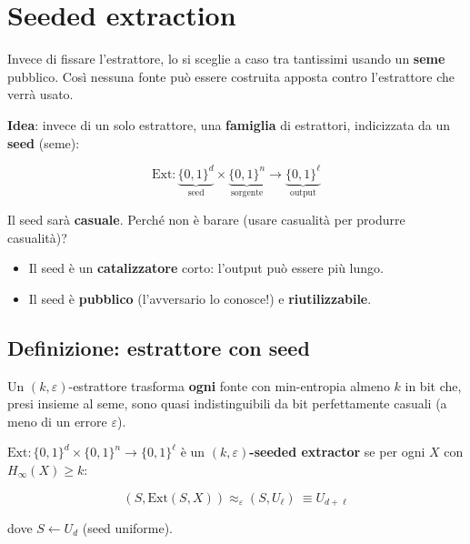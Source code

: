 \section{Seeded extraction}

\begin{inbreve}

Invece di fissare l'estrattore, lo si sceglie a caso tra tantissimi usando un \textbf{seme} pubblico. Così nessuna fonte può essere costruita apposta contro l'estrattore che verrà usato.

\end{inbreve}

\textbf{Idea}: invece di un solo estrattore, una \textbf{famiglia} di estrattori, indicizzata da un \textbf{seed} (seme):

\[
\text{Ext}: \underbrace{\{0,1\}^d}_{\text{seed}} \times \underbrace{\{0,1\}^n}_{\text{sorgente}} \to \underbrace{\{0,1\}^\ell}_{\text{output}}
\]

Il seed sarà \textbf{casuale}. Perché non è barare (usare casualità per produrre casualità)?

\begin{itemize}
\tightlist
\item
  Il seed è un \textbf{catalizzatore} corto: l'output può essere più lungo.
\item
  Il seed è \textbf{pubblico} (l'avversario lo conosce!) e \textbf{riutilizzabile}.
\end{itemize}

\subsection{Definizione: estrattore con seed}

\begin{inbreve}

Un \((k, \varepsilon)\)-estrattore trasforma \textbf{ogni} fonte con min-entropia almeno \(k\) in bit che, presi insieme al seme, sono quasi indistinguibili da bit perfettamente casuali (a meno di un errore \(\varepsilon\)).

\end{inbreve}

\(\text{Ext}: \{0,1\}^d \times \{0,1\}^n \to \{0,1\}^\ell\) è un \((k, \varepsilon)\)\textbf{-seeded extractor} se per ogni \(X\) con \(H_\infty(X) \ge k\):

\[
(S, \text{Ext}(S, X)) \approx_\varepsilon (S, U_\ell) \ \equiv U_{d+\ell}
\]

dove \(S \leftarrow U_d\) (seed uniforme).

